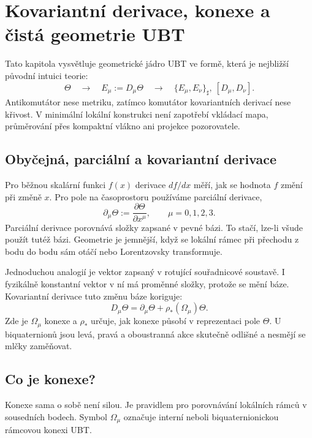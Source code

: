 
\chapter{Kovariantní derivace, konexe a čistá geometrie UBT}
\label{ch:covariant-tetrad}

Tato kapitola vysvětluje geometrické jádro UBT ve formě, která je nejbližší
původní intuici teorie:
\[
 \Theta\quad\longrightarrow\quad E_\mu:=D_\mu\Theta
 \quad\longrightarrow\quad
 \{E_\mu,E_\nu\}_\sharp,\ [D_\mu,D_\nu].
\]
Antikomutátor nese metriku, zatímco komutátor kovariantních derivací nese
křivost. V minimální lokální konstrukci není zapotřebí vkládací mapa,
průměrování přes kompaktní vlákno ani projekce pozorovatele.

\section{Obyčejná, parciální a kovariantní derivace}
Pro běžnou skalární funkci $f(x)$ derivace $df/dx$ měří, jak se
hodnota $f$ změní při změně $x$. Pro pole na časoprostoru používáme
parciální derivace,
\[
 \partial_\mu\Theta:=\frac{\partial\Theta}{\partial x^\mu},
 \qquad \mu=0,1,2,3.
\]
Parciální derivace porovnává složky zapsané v pevné bázi. To stačí,
lze-li všude použít tutéž bázi. Geometrie je jemnější, když se lokální
rámec při přechodu z bodu do bodu sám otáčí nebo Lorentzovsky transformuje.

Jednoduchou analogií je vektor zapsaný v rotující souřadnicové soustavě.
I fyzikálně konstantní vektor v ní má proměnné složky, protože se mění
báze. Kovariantní derivace tuto změnu báze koriguje:
\[
 D_\mu\Theta=\partial_\mu\Theta+\rho_*(\Omega_\mu)\Theta.
\]
Zde je $\Omega_\mu$ konexe a $\rho_*$ určuje, jak konexe působí v
reprezentaci pole $\Theta$. U biquaternionů jsou levá, pravá a oboustranná
akce skutečně odlišné a nesmějí se mlčky zaměňovat.

\section{Co je konexe?}
Konexe sama o sobě není silou. Je pravidlem pro porovnávání lokálních
rámců v sousedních bodech. Symbol $\Omega_\mu$ označuje interní neboli
biquaternionickou rámcovou konexi UBT.

